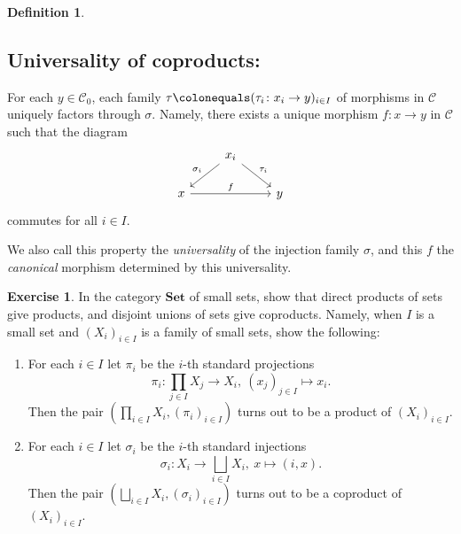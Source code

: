 \documentclass{surv-l}
\numberwithin{equation}{chapter}
\numberwithin{figure}{chapter}
\theoremstyle{plain}
\theoremstyle{definition}
\newtheorem{dfn}[thm]{Definition}
\newtheorem{exc}[thm]{Exercise}
\theoremstyle{remark}
\newcommand{\Ar}[3]{\ar[from={#1}, to={#2}, #3]}
\begin{document}
\begin{dfn}
\begin{enumerate}
\subsection*{Universality of coproducts:}

For each $y \in {\mathcal{C}}_0$,
each family $\tau\colonequals  (\tau_i \colon x_i \to y)_{i\in I}$ of morphisms in ${\mathcal{C}}$
uniquely factors through $\sigma$.
Namely, there exists a unique morphism $f \colon x \to y$ in ${\mathcal{C}}$ such that
the diagram
\begin{equation}\label{eq:coprod}
\begin{tikzcd}
&x_i\\
x&&y
\Ar{1-2}{2-1}{"\sigma_i" '}
\Ar{1-2}{2-3}{"\tau_i"}
\Ar{2-1}{2-3}{"f"}
\end{tikzcd}
\end{equation}
commutes for all $i\in I$.

We also call this property the \emph{universality} of the injection family $\sigma$,
and this $f$ the \emph{canonical} morphism determined by this universality.
\end{enumerate}
\end{dfn}

\begin{exc}
In the category $\mathbf{Set}$ of small sets, show that
direct products of sets give products,
and disjoint unions of sets give coproducts.
Namely, when $I$ is a small set and $(X_i)_{i\in I}$ is a family of small sets,
show the following:
\begin{enumerate}
\item
For each $i\in I$ let $\pi_i$ be the $i$-th standard projections
\[
\pi_i\colon \prod_{j\in I}X_j \to X_i, \ (x_j)_{j\in I} \mapsto x_i.
\]
Then the pair
$(\prod_{i\in I}X_i, (\pi_i)_{i\in I})$ turns out to be a product of $(X_i)_{i\in I}$.
\item
For each $i\in I$ let $\sigma_i$ be the $i$-th standard injections
\[
\sigma_i \colon X_i \to \bigsqcup_{i\in I} X_i, \ x \mapsto (i, x).
\]
Then the pair
$(\bigsqcup_{i\in I} X_i, (\sigma_i)_{i\in I})$ turns out to be a coproduct of $(X_i)_{i\in I}$.
\end{enumerate}
\end{exc}
\end{document}

